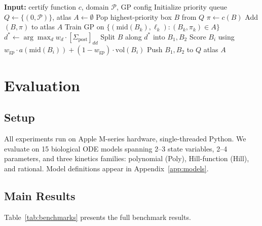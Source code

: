 \documentclass[11pt]{article}
\begin{document}
\begin{algorithm}[t]
\caption{GP-Guided Adaptive Refinement with Posterior-Informed Splitting}
\label{alg:gp-refine}
\begin{algorithmic}[1]
\State \textbf{Input:} certify function $c$, domain $\mathcal{P}$, GP config
\State Initialize priority queue $Q \leftarrow \{(0, \mathcal{P})\}$, atlas $A \leftarrow \emptyset$
  \State Pop highest-priority box $B$ from $Q$
  \State $\pi \leftarrow c(B)$ 
    \State Add $(B, \pi)$ to atlas $A$
      \State Train GP on $\{(\mathrm{mid}(B_k), \ell_k) : (B_k, \pi_k) \in A\}$
    \EndIf
  \Else
    \State $d^* \leftarrow \arg\max_d w_d \cdot [\Sigma_{\mathrm{post}}]_{dd}$ 
    \State Split $B$ along $d^*$ into $B_1, B_2$
    \State Score $B_i$ using $w_{\mathrm{gp}} \cdot a(\mathrm{mid}(B_i)) + (1 - w_{\mathrm{gp}}) \cdot \mathrm{vol}(B_i)$
    \State Push $B_1, B_2$ to $Q$
  \EndIf
\EndWhile
\State \Return atlas $A$
\end{algorithmic}
\end{algorithm}

\section{Evaluation}
\label{sec:eval}

\subsection{Setup}

All experiments run on Apple M-series hardware, single-threaded Python.
We evaluate on 15 biological ODE models spanning 2--3 state variables, 2--4 parameters, and three kinetics families: polynomial (Poly), Hill-function (Hill), and rational.
Model definitions appear in Appendix~\ref{app:models}.

\subsection{Main Results}

Table~\ref{tab:benchmarks} presents the full benchmark results.
\end{document}

